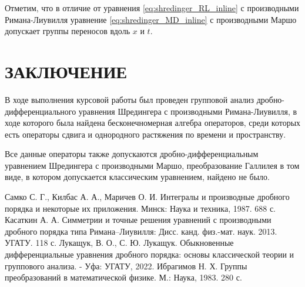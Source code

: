 \documentclass[a4paper, fontsize=14pt]{article}
\begin{document}
Отметим, что в отличие от уравнения \eqref{eq:shredinger_RL_inline} с производными Римана-Лиувилля уравнение \eqref{eq:shredinger_MD_inline} с производными Маршо допускает группы переносов вдоль $x$ и $t$.
\newpage
\section*{ЗАКЛЮЧЕНИЕ}
В ходе выполнения курсовой работы был проведен групповой анализ дробно-дифференциального уравнения Шредингера с производными Римана-Лиувилля,
в ходе которого была найдена бесконечномерная алгебра операторов, среди которых есть операторы сдвига и однородного растяжения по времени и пространству.

Все данные операторы также допускаются дробно-дифференциальным уравнением Шредингера с производными Маршо, преобразование Галлилея в том виде, в котором допускается классическим уравнением, найдено не было.
\newpage

\begin{thebibliography}{9}
  Самко С. Г., Килбас А. А., Маричев О. И. Интегралы и производные дробного порядка и некоторые их приложения. Минск: Наука и техника, 1987. 688 с.
  Касаткин А. А. Симметрии и точные решения уравнений с производными дробного порядка типа Римана–Лиувилля: Дисс. канд. физ.-мат. наук. 2013. УГАТУ. 118 с.
  Лукащук, В. О., С. Ю. Лукащук. Обыкновенные дифференциальные уравнения дробного порядка: основы классической теории и группового анализа. - Уфа: УГАТУ, 2022.
  Ибрагимов Н. Х. Группы преобразований в математической физике. М.: Наука, 1983. 280 с.
\end{thebibliography}

% 
\end{document}
